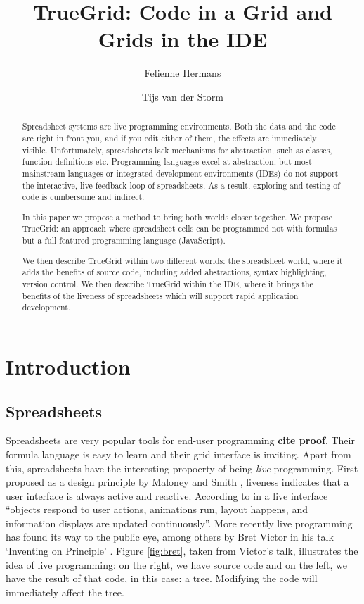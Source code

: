 \documentclass{llncs}
\newcommand{\todo}[1]{\textbf{#1}}
\begin{document}
\title{TrueGrid: Code in a Grid and Grids in the IDE}
\author{Felienne Hermans \and Tijs van der Storm}
\maketitle
\begin{abstract}
Spreadsheet systems are live programming environments. Both the data and the code are right in front you, and if you edit either of them, the effects are immediately visible. Unfortunately, spreadsheets lack mechanisms for abstraction, such as classes, function definitions etc. Programming languages excel at abstraction, but most mainstream languages or integrated development environments (IDEs) do not support the interactive, live feedback loop of spreadsheets. As a result, exploring and testing of code is cumbersome and indirect. 

In this paper we propose a method to bring both worlds closer together. We propose TrueGrid: an approach where spreadsheet cells can be programmed not with formulas but a full featured programming language (JavaScript).

We then describe TrueGrid within two different worlds: the spreadsheet world, where it adds the benefits of source code, including added abstractions, syntax highlighting, version control. We then describe TrueGrid within the IDE, where it brings the benefits of the liveness of spreadsheets which will support rapid application development.
\end{abstract}

\section{Introduction}
\subsection{Spreadsheets}
Spreadsheets are very popular tools for end-user programming \todo{cite proof}. Their formula language is easy to learn and their grid interface is inviting. Apart from this, spreadsheets have the interesting propoerty of being \emph{live} programming. First proposed as a design principle by Maloney and Smith \cite{maloney_directness_1995}, liveness indicates that a user interface is always active and reactive. According to \cite{maloney_directness_1995} in a live interface ``objects respond to user actions, animations run, layout happens, and information displays are updated continuously''. More recently live programming has found its way to the public eye, among others by Bret Victor in his talk `Inventing on Principle' \cite{Victor2012}. Figure \ref{fig:bret}, taken from Victor's talk, illustrates the idea of live programming: on the right, we have source code and on the left, we have the result of that code, in this case: a tree. Modifying the code will immediately affect the tree.
 
\end{document}
